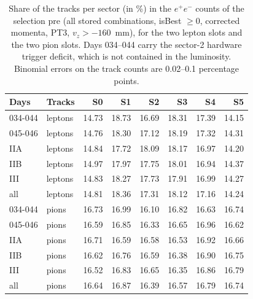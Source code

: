 \begin{table}[H]
\centering\small
\setlength{\tabcolsep}{4pt}
\caption{Share of the tracks per sector (in \%) in the $e^+e^-$ counts of the selection pre (all stored combinations, isBest $\geq 0$, corrected momenta, PT3, $v_z>-160$~mm), for the two lepton slots and the two pion slots. Days 034--044 carry the sector-2 hardware trigger deficit, which is not contained in the luminosity. Binomial errors on the track counts are 0.02--0.1 percentage points.}
\label{tab:smp_sectors}
\begin{tabular}{llrrrrrr}
\toprule
Days & Tracks & S0 & S1 & S2 & S3 & S4 & S5 \\
\midrule
034-044 & leptons & 14.73 & 18.73 & 16.69 & 18.31 & 17.39 & 14.15 \\
045-046 & leptons & 14.76 & 18.30 & 17.12 & 18.19 & 17.32 & 14.31 \\
IIA & leptons & 14.84 & 17.72 & 18.09 & 18.17 & 16.97 & 14.20 \\
IIB & leptons & 14.97 & 17.97 & 17.75 & 18.01 & 16.94 & 14.37 \\
III & leptons & 14.83 & 18.27 & 17.73 & 17.91 & 16.99 & 14.27 \\
all & leptons & 14.81 & 18.36 & 17.31 & 18.12 & 17.16 & 14.24 \\
\midrule
034-044 & pions & 16.73 & 16.99 & 16.10 & 16.82 & 16.63 & 16.74 \\
045-046 & pions & 16.59 & 16.85 & 16.33 & 16.65 & 16.96 & 16.62 \\
IIA & pions & 16.71 & 16.59 & 16.58 & 16.53 & 16.92 & 16.66 \\
IIB & pions & 16.62 & 16.76 & 16.59 & 16.38 & 16.90 & 16.75 \\
III & pions & 16.52 & 16.83 & 16.65 & 16.35 & 16.86 & 16.79 \\
all & pions & 16.64 & 16.87 & 16.39 & 16.57 & 16.79 & 16.74 \\
\bottomrule
\end{tabular}
\end{table}
